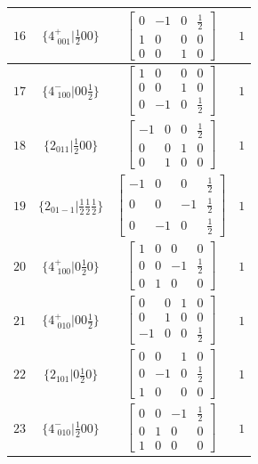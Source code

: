 \documentclass[fleqn,8pt]{jsarticle}
\begin{document}
\begin{longtable}{cccc}
$ 16 $ & $ \{4^{+}_{\,\,001}|\frac{1}{2} 0 0\} $ & $ \begin{bmatrix} 0 & -1 & 0 & \frac{1}{2} \\ 1 & 0 & 0 & 0 \\ 0 & 0 & 1 & 0 \end{bmatrix} $ & $ 1 $ \\ \hline
$ 17 $ & $ \{4^{-}_{\,\,100}|0 0 \frac{1}{2}\} $ & $ \begin{bmatrix} 1 & 0 & 0 & 0 \\ 0 & 0 & 1 & 0 \\ 0 & -1 & 0 & \frac{1}{2} \end{bmatrix} $ & $ 1 $ \\ \hline
$ 18 $ & $ \{2{}_{011}|\frac{1}{2} 0 0\} $ & $ \begin{bmatrix} -1 & 0 & 0 & \frac{1}{2} \\ 0 & 0 & 1 & 0 \\ 0 & 1 & 0 & 0 \end{bmatrix} $ & $ 1 $ \\ \hline
$ 19 $ & $ \{2{}_{01-1}|\frac{1}{2} \frac{1}{2} \frac{1}{2}\} $ & $ \begin{bmatrix} -1 & 0 & 0 & \frac{1}{2} \\ 0 & 0 & -1 & \frac{1}{2} \\ 0 & -1 & 0 & \frac{1}{2} \end{bmatrix} $ & $ 1 $ \\ \hline
$ 20 $ & $ \{4^{+}_{\,\,100}|0 \frac{1}{2} 0\} $ & $ \begin{bmatrix} 1 & 0 & 0 & 0 \\ 0 & 0 & -1 & \frac{1}{2} \\ 0 & 1 & 0 & 0 \end{bmatrix} $ & $ 1 $ \\ \hline
$ 21 $ & $ \{4^{+}_{\,\,010}|0 0 \frac{1}{2}\} $ & $ \begin{bmatrix} 0 & 0 & 1 & 0 \\ 0 & 1 & 0 & 0 \\ -1 & 0 & 0 & \frac{1}{2} \end{bmatrix} $ & $ 1 $ \\ \hline
$ 22 $ & $ \{2{}_{101}|0 \frac{1}{2} 0\} $ & $ \begin{bmatrix} 0 & 0 & 1 & 0 \\ 0 & -1 & 0 & \frac{1}{2} \\ 1 & 0 & 0 & 0 \end{bmatrix} $ & $ 1 $ \\ \hline
$ 23 $ & $ \{4^{-}_{\,\,010}|\frac{1}{2} 0 0\} $ & $ \begin{bmatrix} 0 & 0 & -1 & \frac{1}{2} \\ 0 & 1 & 0 & 0 \\ 1 & 0 & 0 & 0 \end{bmatrix} $ & $ 1 $ \\ \hline

\end{longtable}
\end{document}
